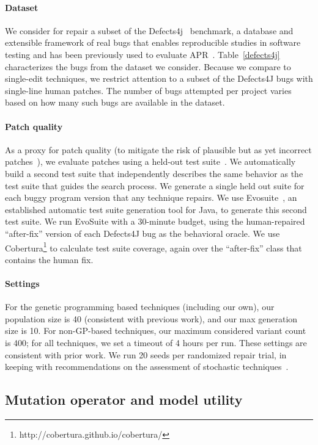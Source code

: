 \documentclass[conference]{IEEEtran}
\begin{document}
\paragraph{Dataset}
We consider for repair a subset of the Defects4j~\cite{just14}
benchmark, a database and extensible 
framework of real bugs that enables reproducible studies in software testing and
has been previously used to evaluate APR~\cite{martinez2016}. 
Table~\ref{defects4j} characterizes the bugs from the dataset we
consider. Because we compare to single-edit techniques, we 
restrict attention to a subset of the Defects4J bugs with single-line human 
patches.  The number of bugs attempted per project varies based on how many such
bugs are available in the dataset.

\paragraph{Patch quality}
As a proxy for patch quality (to mitigate the risk of plausible but as yet
incorrect patches~\cite{Qi15}), we evaluate patches using a held-out test
suite~\cite{legoues12Genprog,smith15}. We automatically build a second test
suite that independently describes the same behavior as the test suite that
guides the search process. We generate a single held out suite for each buggy program version that any technique
repairs.  We use Evosuite~\cite{Fraser11Evosuite}, an established automatic
test suite generation tool for Java, to generate this second test suite. We run EvoSuite
with a 30-minute budget, using the human-repaired ``after-fix'' version of each Defects4J bug
as the behavioral oracle.  We use
Cobertura\footnote{http://cobertura.github.io/cobertura/} to calculate test
suite 
coverage, again over the ``after-fix'' class that contains the human fix.

\paragraph{Settings} For the genetic programming based techniques (including our own), our population
size is 40 (consistent with previous work), and our max generation size is 10.
For non-GP-based techniques, our maximum considered variant count is 400; for
all techniques, we set a timeout of 4 hours per run.  These settings are
consistent with prior work.  We run 20 seeds per randomized repair trial, in
keeping with recommendations on the assessment of stochastic
techniques~\cite{arcuri11}.

\subsection{Mutation operator and model utility} \label{sec:oputil}
\end{document}
